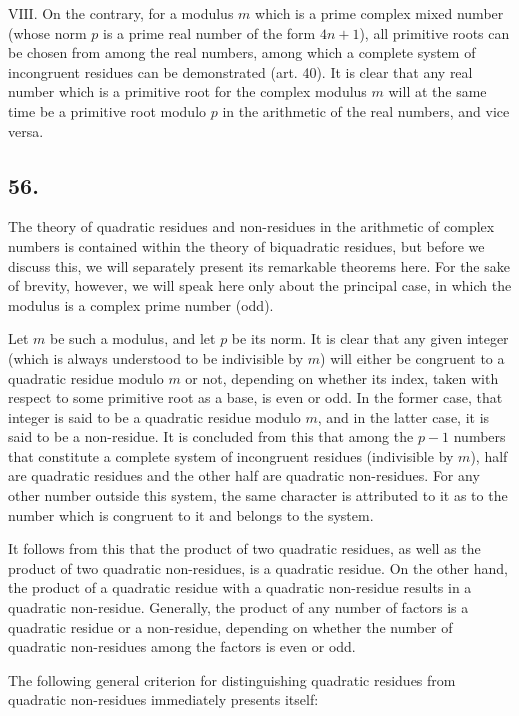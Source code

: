 \documentclass[twoside,12pt]{memoir}
\begin{document}
\(\text{VIII.}\) On the contrary, for a modulus \(m\) which is a prime complex mixed number (whose norm \(p\) is a prime real number of the form \(4 n+1\)), all primitive roots can be chosen from among the real numbers, among which a complete system of incongruent residues can be demonstrated (art. 40).  It is clear that any real number which is a primitive root for the complex modulus \(m\) will at the same time be a primitive root modulo \(p\) in the arithmetic of the real numbers, and vice versa.
%

\subsection*{56.}
 
The theory of quadratic residues and non-residues in the arithmetic of complex numbers is contained within the theory of biquadratic residues, but before we discuss this, we will separately present its remarkable theorems here. For the sake of brevity, however, we will speak here only about the principal case, in which the modulus is a complex prime number (odd).
%

Let \(m\) be such a modulus, and let \(p\) be its norm. It is clear that any given integer (which is always understood to be indivisible by \(m\)) will either be congruent to a quadratic residue modulo \(m\) or not, depending on whether its index, taken with respect to some primitive root as a base, is even or odd. In the former case, that integer is said to be a quadratic residue modulo \(m\), and in the latter case, it is said to be a non-residue. It is concluded from this that among the \(p-1\) numbers that constitute a complete system of incongruent residues (indivisible by \(m\)), half are quadratic residues and the other half are quadratic non-residues. For any other number outside this system, the same character is attributed to it as to the number which is congruent to it and belongs to the system.

It follows from this that the product of two quadratic residues, as well as the product of two quadratic non-residues, is a quadratic residue. On the other hand, the product of a quadratic residue with a quadratic non-residue results in a quadratic non-residue. Generally, the product of any number of factors is a quadratic residue or a non-residue, depending on whether the number of quadratic non-residues among the factors is even or odd.
%

The following general criterion for distinguishing quadratic residues from quadratic non-residues immediately presents itself:
 
\end{document}

